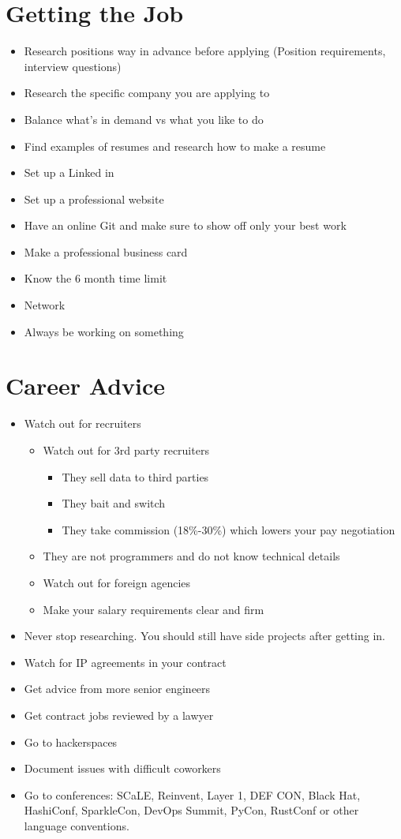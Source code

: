 \documentclass[12pt]{article}
\begin{document}
\section{Getting the Job}
\begin{itemize}
\item Research positions way in advance before applying (Position requirements, interview questions)
\item Research the specific company you are applying to
\item Balance what's in demand vs what you like to do
\item Find examples of resumes and research how to make a resume
\item Set up a Linked in
\item Set up a professional website
\item Have an online Git and make sure to show off only your best work
\item Make a professional business card
\item Know the 6 month time limit
\item Network
\item Always be working on something
\end{itemize}

\section{Career Advice}
\begin{itemize}
\item Watch out for recruiters
  \begin{itemize}
  \item Watch out for 3rd party recruiters
    \begin{itemize}
    \item They sell data to third parties
    \item They bait and switch
    \item They take commission (18\%-30\%) which lowers your pay negotiation
    \end{itemize}
  \item They are not programmers and do not know technical details
  \item Watch out for foreign agencies
  \item Make your salary requirements clear and firm
  \end{itemize}
\item Never stop researching. You should still have side projects after getting in.
\item Watch for IP agreements in your contract
\item Get advice from more senior engineers
\item Get contract jobs reviewed by a lawyer
\item Go to hackerspaces
\item Document issues with difficult coworkers
\item Go to conferences: SCaLE, Reinvent, Layer 1, DEF CON, Black Hat, HashiConf, SparkleCon, DevOps Summit, PyCon, RustConf or other language conventions.
\end{itemize}
\end{document}
